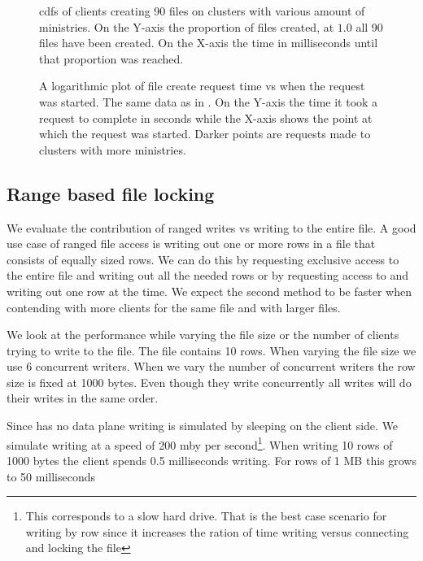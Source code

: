 \begin{figure}[htbp]
	\centering
	
	\caption{\acp{cdf} of clients creating 90 files on clusters with various amount of ministries. On the Y-axis the proportion of files created, at $1.0$ all 90 files have been created. On the X-axis the time in milliseconds until that proportion was reached.}
	\label{fig:touch}
\end{figure}

\begin{figure}[htbp]
	\centering
	
	\caption{A logarithmic plot of file create request time vs when the request was started. The same data as in . On the Y-axis the time it took a request to complete in seconds while the X-axis shows the point at which the request was started. Darker points are requests made to clusters with more ministries.}
	\label{fig:touch_vs_time}
\end{figure}

\clearpage{}
\subsection{Range based file locking}
We evaluate the contribution of ranged writes vs writing to the entire file. A good use case of ranged file access is writing out one or more rows in a file that consists of equally sized rows. We can do this by requesting exclusive access to the entire file and writing out all the needed rows or by requesting access to and writing out one row at the time. We expect the second method to be faster when contending with more clients for the same file and with larger files. 

We look at the performance while varying the file size or the number of clients trying to write to the file. The file contains 10 rows. When varying the file size we use 6 concurrent writers. When we vary the number of concurrent writers the row size is fixed at 1000 bytes. Even though they write concurrently all writes will do their writes in the same order. 

Since \name{} has no data plane writing is simulated by sleeping on the client side. We simulate writing at a speed of 200 \ac{mby} per second\footnote{This corresponds to a slow hard drive. That is the best case scenario for writing by row since it increases the ration of time writing versus connecting and locking the file}. When writing 10 rows of 1000 bytes the client spends 0.5 milliseconds writing. For rows of 1 MB this grows to 50 milliseconds

